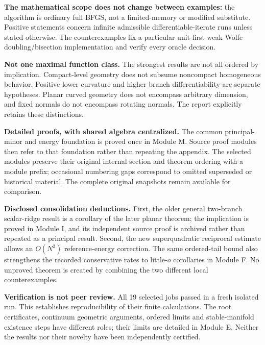 \documentclass[10pt,oneside,openany]{book}
\theoremstyle{remark}\newtheorem{remark}{Remark}[chapter]
\begin{document}
\textbf{The mathematical scope does not change between examples:} the algorithm is ordinary full BFGS, not a limited-memory or modified substitute. Positive statements concern infinite admissible differentiable-iterate runs unless stated otherwise. The counterexamples fix a particular unit-first weak-Wolfe doubling/bisection implementation and verify every oracle decision.

\textbf{Not one maximal function class.} The strongest results are not all ordered by implication. Compact-level geometry does not subsume noncompact homogeneous behavior. Positive lower curvature and higher branch differentiability are separate hypotheses. Planar curved geometry does not encompass arbitrary dimension, and fixed normals do not encompass rotating normals. The report explicitly retains these distinctions.

\textbf{Detailed proofs, with shared algebra centralized.} The common principal-minor and energy foundation is proved once in Module M. Source proof modules then refer to that foundation rather than repeating the appendix. The selected modules preserve their original internal section and theorem ordering with a module prefix; occasional numbering gaps correspond to omitted superseded or historical material. The complete original snapshots remain available for comparison.

\textbf{Disclosed consolidation deductions.} First, the older general two-branch scalar-ridge result is a corollary of the later planar theorem; the implication is proved in Module I, and its independent source proof is archived rather than repeated as a principal result. Second, the new superquadratic reciprocal estimate allows an $O(N^2)$ reference-energy correction. The same ordered-tail bound also strengthens the recorded conservative rates to little-$o$ corollaries in Module F. No unproved theorem is created by combining the two different local counterexamples.

\textbf{Verification is not peer review.} All 19 selected jobs passed in a fresh isolated run. This establishes reproducibility of their finite calculations. The root certificates, continuum geometric arguments, ordered limits and stable-manifold existence steps have different roles; their limits are detailed in Module E. Neither the results nor their novelty have been independently certified.
\end{document}
